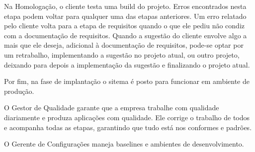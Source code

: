 \documentclass[
	12pt, %
]{fphw}
\begin{document}
\begin{doublespace}
Na Homologação, o cliente testa uma build do projeto. Erros encontrados nesta etapa podem voltar para qualquer uma das etapas anteriores. Um erro relatado pelo cliente volta para a etapa de requisitos quando o que ele pediu não condiz com a documentação de requisitos. Quando a sugestão do cliente envolve algo a mais que ele deseja, adicional à documentação de requisitos, pode-se optar por um retrabalho, implementando a sugestão no projeto atual, ou outro projeto, deixando para depois a implementação da sugestão e finalizando o projeto atual.

Por fim, na fase de implantação o sitema é posto para funcionar em ambiente de produção.

O Gestor de Qualidade garante que a empresa trabalhe com qualidade diariamente e produza aplicações com qualidade. Ele corrige o trabalho de todos e acompanha todas as etapas, garantindo que tudo está nos conformes e padrões.

O Gerente de Configurações maneja baselines e ambientes de desenvolvimento.

\end{doublespace}
\end{document}
